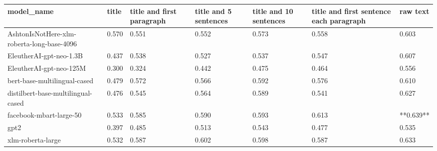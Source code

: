 \begin{tabular}{lllllll}
\toprule
                                model\_name & title & title and first paragraph & title and 5 sentences & title and 10 sentences & title and first sentence each paragraph &  raw text \\
\midrule
AshtonIsNotHere-xlm-roberta-long-base-4096 & 0.570 &                     0.551 &                 0.552 &                  0.573 &                                   0.558 &     0.603 \\
                   EleutherAI-gpt-neo-1.3B & 0.437 &                     0.538 &                 0.527 &                  0.537 &                                   0.547 &     0.607 \\
                   EleutherAI-gpt-neo-125M & 0.300 &                     0.324 &                 0.442 &                  0.475 &                                   0.464 &     0.556 \\
              bert-base-multilingual-cased & 0.479 &                     0.572 &                 0.566 &                  0.592 &                                   0.576 &     0.610 \\
        distilbert-base-multilingual-cased & 0.476 &                     0.545 &                 0.564 &                  0.589 &                                   0.541 &     0.627 \\
                   facebook-mbart-large-50 & 0.533 &                     0.585 &                 0.590 &                  0.593 &                                   0.613 & **0.639** \\
                                      gpt2 & 0.397 &                     0.485 &                 0.513 &                  0.543 &                                   0.477 &     0.535 \\
                         xlm-roberta-large & 0.532 &                     0.587 &                 0.602 &                  0.598 &                                   0.587 &     0.633 \\
\bottomrule
\end{tabular}
